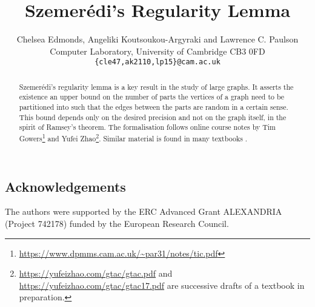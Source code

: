 \documentclass[11pt,a4paper]{article}
\begin{document}
\title{Szemerédi's Regularity Lemma}
\author{Chelsea Edmonds, Angeliki Koutsoukou-Argyraki and Lawrence C. Paulson\\
Computer Laboratory, University of Cambridge CB3 0FD\\
\texttt{\{cle47,ak2110,lp15\}@cam.ac.uk}}

\maketitle

\begin{abstract}
Szemerédi's regularity lemma \cite{szemeredi-regular} is a key result in the study of large graphs. It asserts the existence an upper bound on the number of parts the vertices of a graph need to be partitioned into such that the edges between the parts are random in a certain sense. This bound depends only on the desired precision and not on the graph itself, in the spirit of Ramsey's theorem. The formalisation follows online course notes by Tim Gowers\footnote{\url{https://www.dpmms.cam.ac.uk/~par31/notes/tic.pdf}} 
and Yufei Zhao\footnote{\url{https://yufeizhao.com/gtac/gtac.pdf} and \url{https://yufeizhao.com/gtac/gtac17.pdf} are successive drafts of a textbook in preparation.}. 
Similar material is found in many textbooks \cite{diestel-graph}.
\end{abstract}

\tableofcontents

\subsection*{Acknowledgements}
The authors were supported by the ERC Advanced Grant ALEXANDRIA (Project 742178) funded by the European Research Council. 



\newpage


\end{document}
